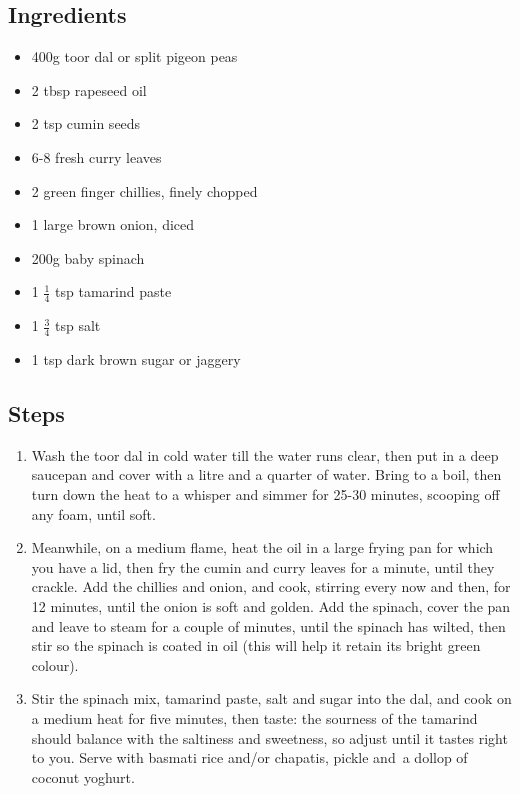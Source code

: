 \documentclass{book}
\begin{document}
\subsection*{Ingredients}
\begin{itemize}
\item 400g toor dal or split pigeon peas 
\item 2 tbsp rapeseed oil 
\item 2 tsp cumin seeds
\item 6-8 fresh curry leaves 
\item 2 green finger chillies, finely chopped
\item 1 large brown onion, diced 
\item 200g baby spinach
\item 1 $\frac{1}{4}$ tsp tamarind paste 
\item 1 $\frac{3}{4}$ tsp salt 
\item 1 tsp dark brown sugar or jaggery
\end{itemize}

\subsection*{Steps}
\begin{enumerate}
\item Wash the toor dal in cold water till the water runs clear, then put in a deep saucepan and cover with a litre and a quarter of water. Bring to a boil, then turn down the heat to a whisper and simmer for 25-30 minutes, scooping off any foam, until soft.
\item Meanwhile, on a medium flame, heat the oil in a large frying pan for which you have a lid, then fry the cumin and curry leaves for a minute, until they crackle. Add the chillies and onion, and cook, stirring every now and then, for 12 minutes, until the onion is soft and golden. Add the spinach, cover the pan and leave to steam for a couple of minutes, until the spinach has wilted, then stir so the spinach is coated in oil (this will help it retain its bright green colour).
\item Stir the spinach mix, tamarind paste, salt and sugar into the dal, and cook on a medium heat for five minutes, then taste: the sourness of the tamarind should balance with the saltiness and sweetness, so adjust until it tastes right to you. Serve with basmati rice and/or chapatis, pickle and a dollop of coconut yoghurt.
\end{enumerate}
\newpage
\end{document}
